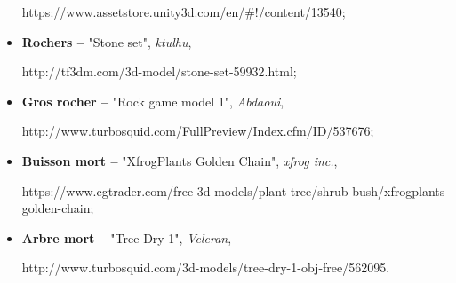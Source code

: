 \begin{itemize}
		https://www.assetstore.unity3d.com/en/\#!/content/13540;
		
		\item \textbf{Rochers --} "Stone set", \textit{ktulhu}, 
		
		http://tf3dm.com/3d-model/stone-set-59932.html;
		
		\item \textbf{Gros rocher --} "Rock game model 1", \textit{Abdaoui}, 
		
		http://www.turbosquid.com/FullPreview/Index.cfm/ID/537676;
		
		\item \textbf{Buisson mort --} "XfrogPlants Golden Chain", \textit{xfrog inc.}, 
		
		https://www.cgtrader.com/free-3d-models/plant-tree/shrub-bush/xfrogplants-golden-chain;
		
		\item \textbf{Arbre mort --} "Tree Dry 1", \textit{Veleran}, 
		
		http://www.turbosquid.com/3d-models/tree-dry-1-obj-free/562095.
	\end{itemize}
	
